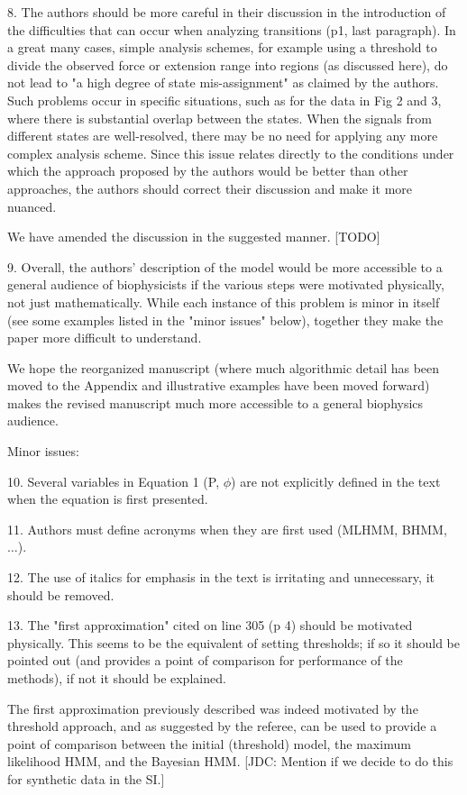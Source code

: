 \documentclass[ucb,qb3,10pt,fullfrom]{ucletter}
\begin{document}
\begin{letter}{}
\color{red}
8. The authors should be more careful in their discussion in the introduction of the difficulties that can occur when analyzing transitions (p1, last paragraph). In a great many cases, simple analysis schemes, for example using a threshold to divide the observed force or extension range into regions (as discussed here), do not lead to "a high degree of state mis-assignment" as claimed by the authors. Such problems occur in specific situations, such as for the data in Fig 2 and 3, where there is substantial overlap between the states. When the signals from different states are well-resolved, there may be no need for applying any more complex analysis scheme. Since this issue relates directly to the conditions under which the approach proposed by the authors would be better than other approaches, the authors should correct their discussion and make it more nuanced.
\color{black}

We have amended the discussion in the suggested manner. {\color{blue} [TODO]}

\color{red}
9. Overall, the authors' description of the model would be more accessible to a general audience of biophysicists if the various steps were motivated physically, not just mathematically. While each instance of this problem is minor in itself (see some examples listed in the "minor issues" below), together they make the paper more difficult to understand.
\color{black}

We hope the reorganized manuscript (where much algorithmic detail has been moved to the Appendix and illustrative examples have been moved forward) makes the revised manuscript much more accessible to a general biophysics audience.

\color{red}
Minor issues:

10. Several variables in Equation 1 (P, $\phi$) are not explicitly defined in the text when the equation is first presented.

11. Authors must define acronyms when they are first used (MLHMM, BHMM, $\ldots$).

12. The use of italics for emphasis in the text is irritating and unnecessary, it should be removed. 

13. The "first approximation" cited on line 305 (p 4) should be motivated physically. This seems to be the equivalent of setting thresholds; if so it should be pointed out (and provides a point of comparison for performance of the methods), if not it should be explained.
\color{black}

The first approximation previously described was indeed motivated by the threshold approach, and as suggested by the referee, can be used to provide a point of comparison between the initial (threshold) model, the maximum likelihood HMM, and the Bayesian HMM.  {\color{blue}[JDC: Mention if we decide to do this for synthetic data in the SI.]}


\end{letter}
\end{document}
